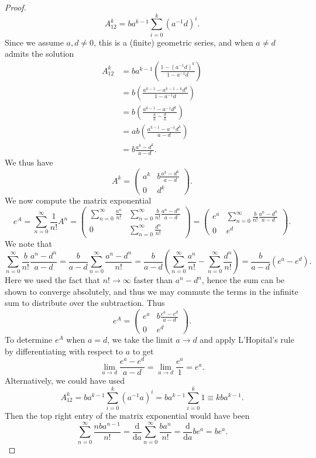 \documentclass[11pt, letterpaper]{article}
\theoremstyle{plain}
\begin{document}
\begin{proof}
	\[
		A_{12} ^{k} =b a^{k-1}\sum_{i=0}^{k}(a^{-1} d)^{i} 
	.\]
	Since we assume $a,d\neq 0$, this is a (finite) geometric series, and when $a\neq d$ admits the solution
	\begin{align*}	
		A_{12} ^{k} &=ba^{k-1} \left( \frac{1-(a^{-1} d)^{k} }{1-a^{-1} d}  \right)\\
			    &=b\left( \frac{a^{k-1} -a^{k-1-k} d^k}{1-a^{-1} d}  \right)\\
			    &=b\left( \frac{a^{k-1} -a^{-1} d^k}{\frac{a}{a} -\frac{d}{a} }  \right) \\
			    &=ab\left( \frac{a^{k-1} -a^{-1} d^k}{a-d}  \right) \\
			    &=b\frac{a^k-d^k}{a-d} 
	.\end{align*}
	We thus have
	\[
		A^k = \begin{pmatrix}
		a^k & b\frac{a^k-d^k}{a-d}  \\
		0 & d^k
		\end{pmatrix}
	.\]
	We now compute the matrix exponential
	\[
		e^{A} =\sum_{n=0}^{\infty} \frac{1}{n!} A^n = \begin{pmatrix}
			\sum_{n=0}^{\infty} \frac{a^n}{n!}  & \sum_{n=0}^{\infty} \frac{b}{n!} \frac{a^n-d^n}{a-d}  \\[10pt]
		0 & \sum_{n=0}^{\infty} \frac{d^n}{n!} 
		\end{pmatrix}=\begin{pmatrix}
		e^a & \sum_{n=0}^{\infty} \frac{b}{n!} \frac{a^n-d^n}{a-d}  \\
		0 & e^d
		\end{pmatrix}
	.\]
	We note that
	\[
		\sum_{n=0}^{\infty} \frac{b}{n!} \frac{a^n-d^n}{a-d} =\frac{b}{a-d} \sum_{n=0}^{\infty} \frac{a^n-d^n}{n!} =\frac{b}{a-d} \left( \sum_{n=0}^{\infty} \frac{a^n}{n!} -\sum_{n=0}^{\infty} \frac{d^n}{n!}  \right) =\frac{b}{a-d} (e^a-e^d)
	.\]
	Here we used the fact that $n!\to \infty $ faster than $a^n -d^n$, hence the sum can be shown to converge absolutely, and thus we may commute the terms in the infinite sum to distribute over the subtraction. Thus
	\[
		e^A = \begin{pmatrix}
		e^a & b\frac{e^a-e^d}{a-d} \\
		0 & e^d
		\end{pmatrix}
	.\]
	To determine $e^A$ when $a=d$, we take the limit $a\to d$ and apply L'Hopital's rule by differentiating with respect to $a$ to get
	\[
		\lim_{a\to d} \frac{e^a-e^d}{a-d} =\lim_{a\to d} \frac{e^a}{1} =e^a
	.\]
	Alternatively, we could have used
	\[
		A^k_{12} =ba^{k-1} \sum_{i=0}^{k} \left( a^{-1} a \right) ^i = ba^{k-1} \sum_{i=0}^{k} 1\equiv kba^{k-1} 
	.\]
	Then the top right entry of the matrix exponential would have been
	\[
		\sum_{n=0}^{\infty} \frac{nba^{n-1} }{n!} =\frac{\mathrm{d}}{\mathrm{d}a} \sum_{n=0}^{\infty} \frac{ba^n}{n!} =\frac{\mathrm{d}}{\mathrm{d}a} be^a = be^a
	.\]
	
\end{proof}
\end{document}
